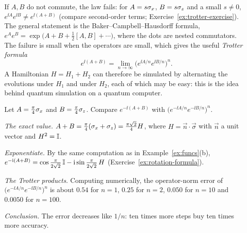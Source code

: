 If $A,B$ do not commute, the law fails: for $A=s\sigma_x$, $B=s\sigma_z$ and a small $s\neq0$, $e^{\ii A}e^{\ii B}\neq e^{\ii(A+B)}$ (compare second-order terms; Exercise~\ref{ex:trotter-exercise}). The general statement is the Baker--Campbell--Hausdorff formula,
$e^Ae^B=\exp\bigl(A+B+\tfrac12[A,B]+\cdots\bigr)$, where the dots are nested commutators. The failure is small when the operators are small, which gives the useful \emph{Trotter formula}
\[
  e^{\ii(A+B)}=\lim_{n\to\infty}\bigl(e^{\ii A/n}e^{\ii B/n}\bigr)^n .
\]
A Hamiltonian $H=H_1+H_2$ can therefore be simulated by alternating the evolutions under $H_1$ and under $H_2$, each of which may be easy: this is the idea behind quantum simulation on a quantum computer.

\begin{example}\label{ex:trotter}
  Let $A=\frac\pi4\sigma_x$ and $B=\frac\pi4\sigma_z$. Compare $e^{-\ii(A+B)}$ with $\bigl(e^{-\ii A/n}e^{-\ii B/n}\bigr)^n$.
\end{example}
\begin{solution}
  \begin{steps}
    \item \emph{The exact value.} $A+B=\frac\pi4(\sigma_x+\sigma_z)=\frac{\pi\sqrt2}{4}H$, where $H=\vec n\cdot\vec\sigma$ with $\vec n$ a unit vector and $H^2=\mathbb{I}$.
    \item \emph{Exponentiate.} By the same computation as in Example~\ref{ex:funcs}(b), $e^{-\mathrm{i}(A+B)}=\cos\tfrac{\pi}{2\sqrt2}\,\mathbb{I}-\mathrm{i}\sin\tfrac{\pi}{2\sqrt2}\,H$ (Exercise~\ref{ex:rotation-formula}).
    \item \emph{The Trotter products.} Computing numerically, the operator-norm error of $\bigl(e^{-\ii A/n}e^{-\ii B/n}\bigr)^n$ is about $0.54$ for $n=1$, $0.25$ for $n=2$, $0.050$ for $n=10$ and $0.0050$ for $n=100$.
    \item \emph{Conclusion.} The error decreases like $1/n$: ten times more steps buy ten times more accuracy.
  \end{steps}
\end{solution}


